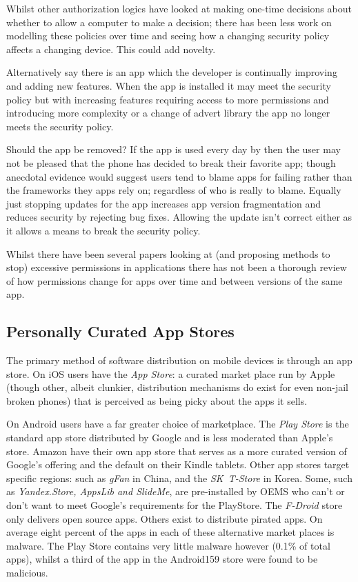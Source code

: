 \documentclass[a4paper,sfsidenotes]{tufte-book}
\begin{document}
Whilst other authorization logics have looked at making one-time decisions about
whether to allow a computer to make a decision; there has been less work on
modelling these policies over time and seeing how a changing security policy
affects a changing device.  This could add novelty.

Alternatively say there is an app which the developer is continually improving
and adding new features.  When the app is installed it may meet the security
policy but with increasing features requiring access to more permissions and
introducing more complexity or a change of advert library the app no longer
meets the security policy.

Should the app be removed?  If the app is used every day by then the user may
not be pleased that the phone has decided to break their favorite
app; though anecdotal evidence would suggest users tend to blame apps
  for failing rather than the frameworks they apps rely on; regardless of who is
  really to blame. Equally just stopping updates for the app increases app
version fragmentation and reduces security by rejecting bug fixes.  Allowing the
update isn't correct either as it allows a means to break the security policy.

Whilst there have been several papers looking at (and proposing methods to stop)
excessive permissions in applications\cite{Felt:2011kj}\cite{Vidas:2011wr} there
has not been a thorough review of how permissions change for apps over time
and between versions of the same app. 



\subsection{Personally Curated App Stores}

The primary method of software distribution on mobile devices is through an app
store.  On iOS users have the \emph{App Store}: a curated market place run by
Apple (though other, albeit clunkier, distribution mechanisms do exist for even
non-jail broken phones) that is perceived as being picky about the apps it sells.

On Android users have a far greater choice of marketplace.  The \emph{Play
  Store} is the standard app store distributed by Google and is less moderated
than Apple's store.  Amazon have their own app store that serves as a more
curated version of Google's offering and the default on their Kindle tablets.
Other app stores target specific regions: such as \emph{gFan} in China, and the
\emph{SK~T-Store} in Korea.  Some, such as \emph{Yandex.Store, AppsLib and
  SlideMe}, are pre-installed by OEMS who can't or don't want to meet Google's
requirements for the PlayStore.  The \emph{F-Droid} store only delivers open
source apps. Others exist to distribute pirated apps.  On average eight
percent\cite{AQUILINO:2013wr} of the apps in each of these alternative market
places is malware. The Play Store contains very little malware however (0.1\% of
total apps), whilst a third of the app in the Android159 store were found to be
malicious.
\end{document}
